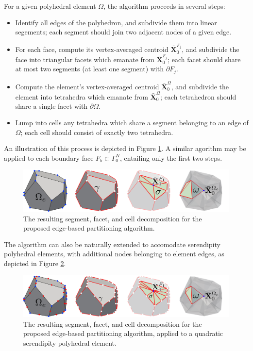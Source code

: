 	For a given polyhedral element $\Omega$, the algorithm proceeds in several steps:
	\begin{itemize}
		\item[1.)] Identify all edges of the polyhedron, and subdivide them into linear segements; each segment should join two adjacent nodes of a given edge.
		\item[2.)] For each face, compute its vertex-averaged centroid $\bar{\mathbf{X}}^{F_j}_0$, and subdivide the face into triangular facets which emanate from $\bar{\mathbf{X}}^{F_j}_0$; each facet should share at most two segments (at least one segment) with $\partial F_j$.
		\item[3a.)] Compute the element's vertex-averaged centroid $\bar{\mathbf{X}}^{\Omega}_0$, and subdivide the element into tetrahedra which emanate from $\bar{\mathbf{X}}^{\Omega}_0$; each tetrahedron should share a single facet with $\partial \Omega$.
		\item[3b.)] Lump into cells any tetrahedra which share a segment belonging to an edge of $\Omega$; each cell should consist of exactly two tetrahedra.
	\end{itemize}
	An illustration of this process is depicted in Figure \ref{fig:partitioning_algorithm}. A similar agorithm may be applied to each boundary face $F_b \subset \Gamma^N_0$, entailing only the first two steps. 
	\begin{figure} [!ht]
		\centering
		\includegraphics[width = 6.0in]{figures/partitioning_algorithm.pdf}
		\caption{The resulting segment, facet, and cell decomposition for the proposed edge-based partitioning algorithm.}
		\label{fig:partitioning_algorithm}
	\end{figure}
	
	The algorithm can also be naturally extended to accomodate serendipity polyhedral elements, with additional nodes belonging to element edges, as depicted in Figure \ref{fig:partitioning_algorithm_quadratic}.
	\begin{figure} [!ht]
		\centering
		\includegraphics[width = 6.0in]{figures/partitioning_algorithm_quadratic.pdf}
		\caption{The resulting segment, facet, and cell decomposition for the proposed edge-based partitioning algorithm, applied to a quadratic serendipity polyhedral element.}
		\label{fig:partitioning_algorithm_quadratic}
	\end{figure}


